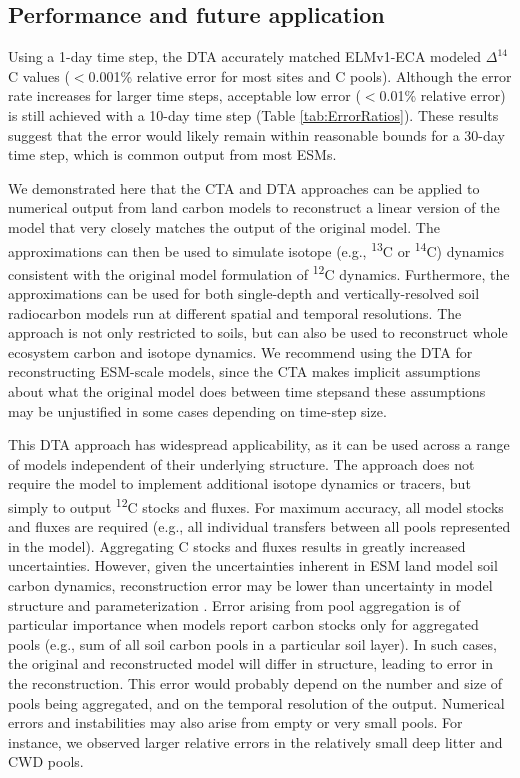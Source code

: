 \documentclass[draft]{agujournal2019}
\providecommand{\DIFadd}[1]{{\protect\color{blue}\uwave{#1}}} %
\providecommand{\DIFaddbegin}{} %
\providecommand{\DIFaddend}{} %
\begin{document}
\subsection{Performance and future application}
Using a 1-day time step, the DTA accurately matched ELMv1-ECA modeled $\Delta^{14}$C values ($<$0.001\% relative error for most sites and C pools). Although the error rate increases for larger time steps, acceptable low error ($<$0.01\% relative error) is still achieved with a 10-day time step (Table \ref{tab:ErrorRatios}). These results suggest that the error would likely remain within reasonable bounds for a 30-day time step, which is common output from most ESMs.

We demonstrated here that the CTA and DTA  approaches can be applied to numerical output from land carbon models to reconstruct a linear version of the model that very closely matches the output of the original model. The approximations can then be used to simulate isotope (e.g., \textsuperscript{13}C or \textsuperscript{14}C) dynamics consistent with the original model formulation of \textsuperscript{12}C dynamics. Furthermore, the approximations can be used for both single-depth and vertically-resolved soil radiocarbon models run at different spatial and temporal resolutions. The approach is not only restricted to soils, but can also be used to reconstruct whole ecosystem carbon and isotope dynamics.  We recommend using the DTA for reconstructing ESM-scale models, since the CTA makes implicit assumptions about what the original model does between time steps\DIFaddbegin \DIFadd{, }\DIFaddend and these assumptions may  be unjustified in some cases depending on time-step size.

This DTA approach has widespread applicability, as it can be used across a range of models independent of their underlying structure. The approach does not require the model to implement additional isotope dynamics or tracers, but simply to output \textsuperscript{12}C stocks and fluxes. For maximum accuracy, all model stocks and fluxes are required (e.g., all individual transfers between all pools represented in the model). Aggregating C stocks and fluxes results in greatly increased uncertainties. However, given the uncertainties inherent in ESM land model soil carbon dynamics, reconstruction error may be lower than uncertainty in model structure and parameterization \cite{Chen2009JGR}. Error arising from pool aggregation is of particular importance when models report carbon stocks only for aggregated pools (e.g., sum of all soil carbon pools in a particular soil layer). In such cases, the original and reconstructed model will differ in structure, leading to error in the reconstruction. This error would probably depend on the number and size of pools being aggregated, and on the temporal resolution of the output. Numerical errors and instabilities may also arise from empty or very small pools. For instance, we observed larger relative errors in the relatively small deep litter and CWD pools.
\end{document}
